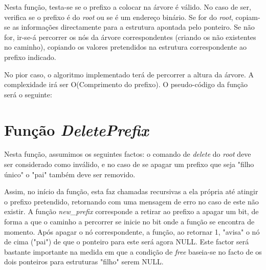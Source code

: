 \documentclass[twocolumn]{article}
\begin{document}
Nesta função, testa-se se o prefixo a colocar na árvore é válido. No caso de ser, verifica se o prefixo é do \textit{root} ou se é um endereço binário. Se for do \textit{root}, copiam-se as informações directamente para a estrutura apontada pelo ponteiro. Se não for, ir-se-á percorrer os nós da árvore correspondentes (criando os não existentes no caminho), copiando os valores pretendidos na estrutura correspondente ao prefixo indicado.

No pior caso, o algoritmo implementado terá de percorrer a altura da árvore. A complexidade irá ser O(Comprimento do prefixo).
O pseudo-código da função será o seguinte:
\begin{algorithmic}
 \If{$adress\_is\_invalid$}{
 	\Return\;
 \EndIf
 \If{$adress\_is\_"*"$}{\Comment{root prefix}
 	\State $root \rightarrow next\_hop:=next\_hop\;$
 \Else
    \State $auxiliar\_node:=root\_node\;$
 	\While{$all\_prefix\_nodes\_havent\_been\_visited\_yet$}{
 		\If{$bit\_is\_0$}{
 			\If{$there\_is\_no\_node$}
 				\State $node\_creation()\;$
 			\EndIf
 			\State $auxiliar:=auxiliar \rightarrow zero\;$
 		\Else \Comment{bit is one} 			
 			\If{$there\_is\_no\_node$}
 				\State $node\_creation()\;$
 			\EndIf
 			\State $auxiliar:=auxiliar \rightarrow one\;$
 		\EndIf
		\State $auxiliar \rightarrow next\_hop:=next\_hop\;$ 	
 	\EndWhile
 \EndIf
 \caption{AddPrefix}
\end{algorithmic}

\section{Função \textit{DeletePrefix}}
Nesta função, assumimos os seguintes factos: o comando de \textit{delete} do \textit{root} deve ser considerado como inválido, e no caso de se apagar um prefixo que seja "filho único" o "pai" também deve ser removido.

Assim, no início da função, esta faz chamadas recursivas a ela própria até atingir o prefixo pretendido, retornando com uma mensagem de erro no caso de este não existir.
 A função \textit{new\_prefix} corresponde a retirar ao prefixo a apagar um bit, de forma a que o caminho a percorrer se inicie no bit onde a função se encontra de momento. %
Após apagar o nó correspondente, a função, ao retornar 1, "avisa" o nó de cima ("pai") de que o ponteiro para este será agora NULL. Este factor será bastante importante na medida em que a condição de \textit{free} baseia-se no facto de os dois ponteiros para estruturas "filho" serem NULL.
\end{document}
